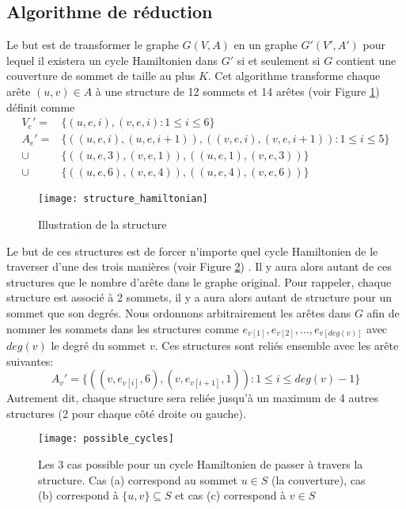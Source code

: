 \documentclass[../main.tex]{subfiles}
\begin{document}
\subsection{Algorithme de réduction}
Le but est de transformer le graphe $G(V,A)$ en un graphe $G'(V', A')$ pour lequel il existera un cycle Hamiltonien dans $G'$ si et seulement si $G$ contient une couverture de sommet de taille au plus $K$. Cet algorithme transforme chaque arête $(u,v)\in A$ à une structure de 12 sommets et 14 arêtes (voir Figure \ref{fig:structure_hamiltonian}) définit comme
\begin{align*}
V_e' = &\{(u,e,i),(v,e,i): 1 \leq i \leq 6\}\\
A_e' = &\{((u, e, i), (u,e,i+1)), ((v, e, i), (v,e,i+1)): 1 \leq i \leq 5 \}\\
\cup &\{((u, e, 3), (v,e,1)), ((u, e, 1), (v,e,3))\}\\
\cup &\{((u, e, 6), (v,e,4)), ((u, e, 4), (v,e,6))\}
\end{align*}

\begin{figure}[!htb]
    \centering
    \texttt{[image: structure\_hamiltonian]}
    \caption{Illustration de la structure}
    \label{fig:structure_hamiltonian}
\end{figure}


Le but de ces structures est de forcer n'importe quel cycle Hamiltonien de le traverser d'une des trois manières (voir Figure \ref{fig:possible_cycles}) . Il y aura alors autant de ces structures que le nombre d'arête dans le graphe original. Pour rappeler, chaque structure est associé à 2 sommets, il y a aura alors autant de structure pour un sommet que son degrés. Nous ordonnons arbitrairement les arêtes dans $G$ afin de nommer les sommets dans les structures comme $e_{v[1]},e_{v[2]},\dots, e_{v[deg(v)]}$ avec $deg(v)$ le degré du sommet $v$. Ces structures sont reliés ensemble avec les arête suivantes:
\[
A_v' = \{((v, e_{v[i]}, 6), (v, e_{v[i+1]}, 1)): 1 \leq i \leq deg(v)-1 \}
\]
Autrement dit, chaque structure sera reliée jusqu'à un maximum de 4 autres structures (2 pour chaque côté droite ou gauche).

\begin{figure}[!htb]
    \centering
    \texttt{[image: possible\_cycles]}
    \caption{Les 3 cas possible pour un cycle Hamiltonien de passer à travers la structure. Cas (a) correspond au sommet $u \in S$ (la couverture), cas (b) correspond à $\{u,v\} \subseteq S$ et cas (c) correspond à $v \in S$}
    \label{fig:possible_cycles}
\end{figure}
\end{document}
